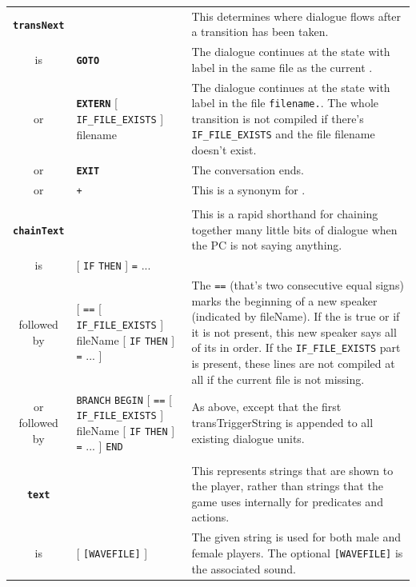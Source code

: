\documentclass{article}
\def\ttref#1{\ahrefloc{#1}{\tt #1}}
\def\DEFINE#1{{\tt \bf #1}\label{#1}\index{#1}}
\def\t#1{{\tt #1}}
\def\Ob{{\color{red} [ }}
\def\Oe{{\color{red} ] }}
\begin{document}
\begin{tabular}{cp{10in}|p{10in}}
\\

\DEFINE{transNext} & & This determines where dialogue flows after a
transition has been taken. \\
is & \DEFINE{GOTO} \ttref{stateLabel} &
  The dialogue continues at the state with label \ttref{stateLabel} in the
  same \ttref{DLG} file as the current \ttref{state}. \\
or & \DEFINE{EXTERN} \Ob \t{IF_FILE_EXISTS} \Oe filename \ttref{stateLabel} &
  The dialogue continues at the state with label \ttref{stateLabel} in the
  file \t{filename.}\ttref{DLG}. The whole transition is not compiled if there's
  \t{IF_FILE_EXISTS} and the file filename doesn't exist. \\
or & \DEFINE{EXIT} &
  The conversation ends. \\
or & \t{+} \ttref{stateLabel} &
  This is a synonym for \ttref{GOTO}. \\

\\

\DEFINE{chainText} & & This is a rapid shorthand for chaining together many
little bits of dialogue when the PC is not saying anything. \\
is & \Ob \t{IF} \ttref{transTriggerString} \t{THEN} \Oe \ttref{sayText}
      \t{=} \ttref{sayText} ... & \\
followed by &
      \Ob \t{==} \Ob \t{IF_FILE_EXISTS} \Oe fileName
      \Ob \t{IF} \ttref{transTriggerString} \t{THEN} \Oe \ttref{sayText}
      \t{=} \ttref{sayText} ... \Oe &
      The \t{==} (that's two consecutive equal signs) marks the beginning of a
      new speaker (indicated by fileName).  If the
      \ttref{transTriggerString} is true or if it is not present, this new
      speaker says all of its \ttref{sayText} in order. If the \t{IF_FILE_EXISTS}
      part is present, these lines are not compiled at all if the current file is
      not missing.
      \\
or followed by &
    \t{BRANCH} \ttref{transTriggerString} \t{BEGIN}
      \Ob \t{==} \Ob \t{IF_FILE_EXISTS} \Oe fileName
      \Ob \t{IF} \ttref{transTriggerString} \t{THEN} \Oe \ttref{sayText}
      \t{=} \ttref{sayText} ... \Oe
    \t{END} &
      As above, except that the first transTriggerString is appended to all
      existing dialogue units.\\
\\

\DEFINE{text} & & This represents strings that are shown to the player,
rather than strings that the game uses internally for predicates and
actions. \\
is & \ttref{String} \Ob \t{[WAVEFILE]} \Oe & The given string is used for both male and
female players. The optional \t{[WAVEFILE]} is the associated sound. \\


\end{tabular}
\end{document}
